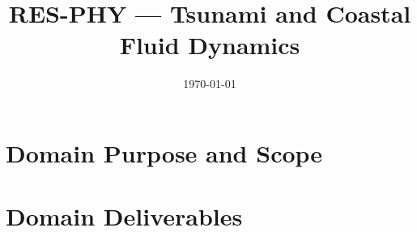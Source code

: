 \documentclass[12pt,a4paper]{article}
\title{RES-PHY --- Tsunami and Coastal Fluid Dynamics}
\author{}
\date{\today}
\begin{document}
\maketitle

\tableofcontents
\clearpage

\section{Domain Purpose and Scope}
\label{sec:res-phy-domain-purpose}


\section{Domain Deliverables}
\label{sec:res-phy-domain-deliverables}









\clearpage
\printbibliography[
  heading=bibintoc,
  title={References}
]
\end{document}
